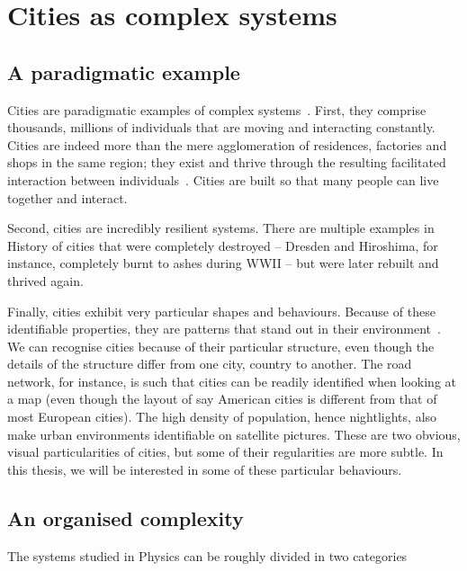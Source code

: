 \section{Cities as complex systems}
\label{sec:cities_as_complex_systems}

\subsection{A paradigmatic example}
\label{sub:a_paradigmatic_example}

Cities are paradigmatic examples of complex systems~\cite{Ladyman:2013}.  First,
they comprise thousands, millions of individuals that are moving and interacting
constantly. Cities are indeed more than the mere agglomeration of residences,
factories and shops in the same region; they exist and thrive through the
resulting facilitated interaction between individuals~\cite{Bettencourt:2013,
Sim:2015}. Cities are built so that many people can live together and interact. 

Second, cities are incredibly resilient systems. There are multiple examples in
History of cities that were completely destroyed -- Dresden and Hiroshima, for
instance, completely burnt to ashes during WWII -- but were later rebuilt and
thrived again.

Finally, cities exhibit very particular shapes and behaviours. Because of these
identifiable properties, they are patterns that stand out in their
environment~\cite{Dennett:1991}. We can recognise cities because of their
particular structure, even though the details of the structure differ from one
city, country to another. The road network, for instance, is such that cities
can be readily identified when looking at a map (even though the layout of
 say American cities is different from that of most European cities). The high density of
population, hence nightlights, also make urban environments identifiable on
satellite pictures. These are two obvious, visual particularities of cities, but
some of their regularities are more subtle. In this thesis, we will be
interested in some of these particular behaviours.\\


\subsection{An organised complexity}
\label{sub:an_organised_complexity}

The systems studied in Physics can be roughly divided in two
categories~\cite{Parisi:1999}


